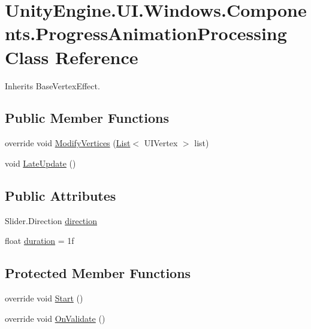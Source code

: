 \hypertarget{class_unity_engine_1_1_u_i_1_1_windows_1_1_components_1_1_progress_animation_processing}{}\section{Unity\+Engine.\+U\+I.\+Windows.\+Components.\+Progress\+Animation\+Processing Class Reference}
\label{class_unity_engine_1_1_u_i_1_1_windows_1_1_components_1_1_progress_animation_processing}


Inherits Base\+Vertex\+Effect.

\subsection*{Public Member Functions}
\begin{DoxyCompactItemize}
\item 
override void \hyperlink{class_unity_engine_1_1_u_i_1_1_windows_1_1_components_1_1_progress_animation_processing_a875e45f40cb246ce63aa1661c52654e4}{Modify\+Vertices} (\hyperlink{class_unity_engine_1_1_u_i_1_1_windows_1_1_components_1_1_list}{List}$<$ U\+I\+Vertex $>$ list)
\item 
void \hyperlink{class_unity_engine_1_1_u_i_1_1_windows_1_1_components_1_1_progress_animation_processing_a9828fed9d2c5a178d0c9b07f50cbd244}{Late\+Update} ()
\end{DoxyCompactItemize}
\subsection*{Public Attributes}
\begin{DoxyCompactItemize}
\item 
Slider.\+Direction \hyperlink{class_unity_engine_1_1_u_i_1_1_windows_1_1_components_1_1_progress_animation_processing_a8fc06ea6de9756378a1f3d04ee2763ea}{direction}
\item 
float \hyperlink{class_unity_engine_1_1_u_i_1_1_windows_1_1_components_1_1_progress_animation_processing_ab3bf8ecfd31fb624983b62f78381b962}{duration} = 1f
\end{DoxyCompactItemize}
\subsection*{Protected Member Functions}
\begin{DoxyCompactItemize}
\item 
override void \hyperlink{class_unity_engine_1_1_u_i_1_1_windows_1_1_components_1_1_progress_animation_processing_ad5efd43aff177c226114f4669c4aacc8}{Start} ()
\item 
override void \hyperlink{class_unity_engine_1_1_u_i_1_1_windows_1_1_components_1_1_progress_animation_processing_a51354cc34d5d1d6e5362690b08761847}{On\+Validate} ()
\end{DoxyCompactItemize}


